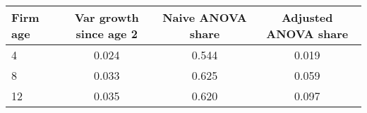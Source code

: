 \begin{tabular}{lccc}
Firm age & Var  growth since age 2 & Naive ANOVA share & Adjusted ANOVA share \\
\hline
4 &     0.024 &  0.544 &  0.019 \\
8 &     0.033 &  0.625 &  0.059 \\
12 &     0.035 &  0.620 &  0.097 \\
\end{tabular}
